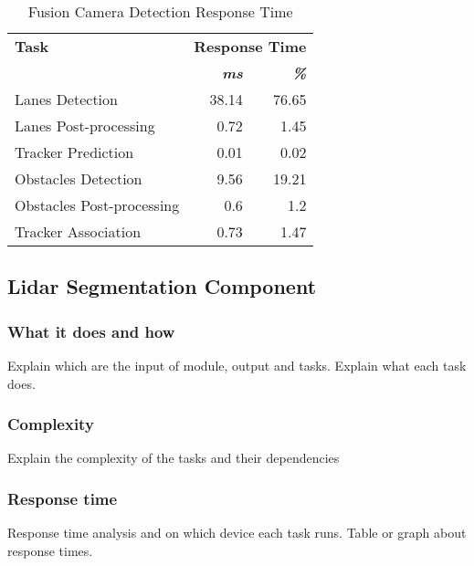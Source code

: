 \documentclass[conference]{IEEEtran}
\begin{document}
\begin{table}[htbp]
    \begin{center}
    \begin{adjustbox}{max width=\columnwidth}
        \setlength{\tabcolsep}{0.5em}
        \renewcommand{\arraystretch}{1.2}
        \begin{tabular}{|l|r|r|}
            \hline
            \textbf{Task}&\multicolumn{2}{|c|}{\textbf{Response Time}} \\
            \cline{2-3} 
            & \textbf{\textit{ms}}& \textbf{\textit{\%}}\\
            \hline
            Lanes Detection & 38.14 & 76.65\\
            \hline
            Lanes Post-processing & 0.72 & 1.45 \\
            \hline
            Tracker Prediction & 0.01 & 0.02\\
            \hline
            Obstacles Detection & 9.56 & 19.21\\
            \hline
            Obstacles Post-processing & 0.6 & 1.2\\
            \hline
            Tracker Association & 0.73 & 1.47\\
            \hline
            \end{tabular}    
    \end{adjustbox}
    \label{fusion_detection_component_response_time_table}
    \end{center}
    \caption{Fusion Camera Detection Response Time}
\end{table}

\subsection{Lidar Segmentation Component}

\subsubsection{What it does and how}
Explain which are the input of module, output and tasks.
Explain what each task does.
\subsubsection{Complexity}
Explain the complexity of the tasks and their dependencies
\subsubsection{Response time}
Response time analysis and on which device each task runs.
Table or graph about response times.
\end{document}
